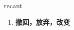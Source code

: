 
\begin{frame}
{\huge recant}
\begin{center}
\begin{enumerate}\Large
  \item \textbf{撤回，放弃，改变}
\end{enumerate}
\end{center}
\end{frame}
